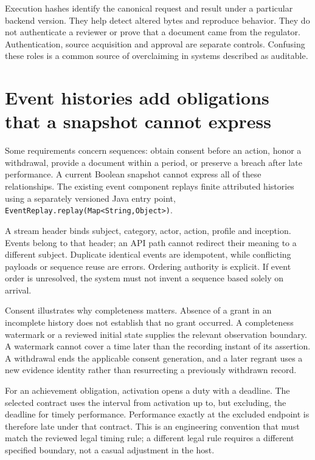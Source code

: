 \documentclass[12pt,a4paper,oneside,openany]{book}
\begin{document}
Execution hashes identify the canonical request and result under a particular
backend version. They help detect altered bytes and reproduce behavior. They do
not authenticate a reviewer or prove that a document came from the regulator.
Authentication, source acquisition and approval are separate controls. Confusing
these roles is a common source of overclaiming in systems described as auditable.

\section{Event histories add obligations that a snapshot cannot express}

Some requirements concern sequences: obtain consent before an action, honor a
withdrawal, provide a document within a period, or preserve a breach after late
performance. A current Boolean snapshot cannot express all of these relationships.
The existing event component replays finite attributed histories using a separately
versioned Java entry point, \texttt{EventReplay.replay(Map<String,Object>)}.

A stream header binds subject, category, actor, action, profile and inception.
Events belong to that header; an API path cannot redirect their meaning to a
different subject. Duplicate identical events are idempotent, while conflicting
payloads or sequence reuse are errors. Ordering authority is explicit. If event
order is unresolved, the system must not invent a sequence based solely on arrival.

Consent illustrates why completeness matters. Absence of a grant in an incomplete
history does not establish that no grant occurred. A completeness watermark or a
reviewed initial state supplies the relevant observation boundary. A watermark
cannot cover a time later than the recording instant of its assertion. A
withdrawal ends the applicable consent generation, and a later regrant uses a new
evidence identity rather than resurrecting a previously withdrawn record.

For an achievement obligation, activation opens a duty with a deadline. The
selected contract uses the interval from activation up to, but excluding, the
deadline for timely performance. Performance exactly at the excluded endpoint is
therefore late under that contract. This is an engineering convention that must
match the reviewed legal timing rule; a different legal rule requires a different
specified boundary, not a casual adjustment in the host.
\end{document}

